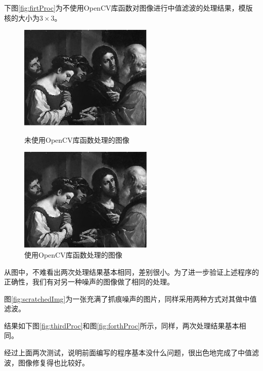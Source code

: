 \documentclass[a4paper]{ctexrep}
\begin{document}
下图\ref {fig:firtProc}为不使用OpenCV库函数对图像进行中值滤波的处理结果，模版核的大小为$3\times3$。

\begin{figure}[h]
\centering
\begin{varwidth}[t]{\textwidth}
\vspace{0pt}
\includegraphics[height=5cm]{img/processedImage1.pdf}
\caption{未使用OpenCV库函数处理的图像}
\label{fig:firtProc}
\end{varwidth}%
\quad
\begin{varwidth}[t]{\textwidth}
\vspace{0pt}
\centering
\includegraphics[height=5cm]{img/processedImage2.pdf}
\caption{使用OpenCV库函数处理的图像}
\label{fig:secondProc}
\end{varwidth}
\end{figure}


从图中，不难看出两次处理结果基本相同，差别很小。为了进一步验证上述程序的正确性，我们有对另一种噪声的图像做了相同的处理。

图\ref{fig:scratchedImg}为一张充满了抓痕噪声的图片，同样采用两种方式对其做中值滤波。

结果如下图\ref{fig:thirdProc}和图\ref{fig:forthProc}所示，同样，两次处理结果基本相同。

经过上面两次测试，说明前面编写的程序基本没什么问题，很出色地完成了中值滤波，图像修复得也比较好。
\end{document}
